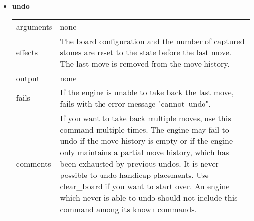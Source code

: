 \documentclass[a4paper]{article}
\begin{document}
\begin{itemize}
\item \textbf{undo} \\
  \begin{tabularx}{\linewidth}{lX}
    arguments & none \\
    effects &   The board configuration and the number of captured stones
                are reset to the state before the last move. The last move
                is removed from the move history.\\
    output &    none \\
    fails &     If the engine is unable to take back the last move, fails
                with the error message "cannot~undo".\\
    comments &  If you want to take back multiple moves, use this command
                multiple times.
                The engine may fail to undo if the move history is empty or
                if the engine only maintains a partial move history, which
                has been exhausted by previous undos.
                It is never possible to undo handicap placements. Use
                clear\_board if you want to start over.
                An engine which never is able to undo should not include
                this command among its known commands.
  \end{tabularx}
\end{itemize}
\end{document}
